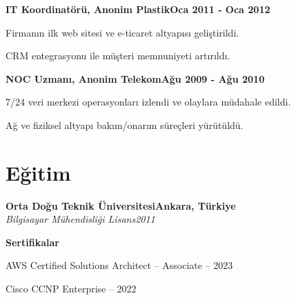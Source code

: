 \documentclass[a4paper,11pt]{article}
\newcommand{\heading}[2]{
  \hspace{10pt}#1\hfill#2\\
}
\newcommand{\headingBf}[2]{
  \heading{\textbf{#1}}{\textbf{#2}}
}
\newcommand{\headingIt}[2]{
  \heading{\textit{#1}}{\textit{#2}}
}
\newenvironment{resume_list}{
  \vspace{-7pt}
  \begin{itemize}[itemsep=-2px, parsep=1pt, leftmargin=30pt] 
}{
  \end{itemize}
}
\begin{document}
  \headingBf{IT Koordinatörü, Anonim Plastik}{Oca 2011 - Oca 2012}
  \begin{resume_list}
    \item Firmanın ilk web sitesi ve e-ticaret altyapısı geliştirildi.
    \item CRM entegrasyonu ile müşteri memnuniyeti artırıldı.
  \end{resume_list}

  \headingBf{NOC Uzmanı, Anonim Telekom}{Ağu 2009 - Ağu 2010}
  \begin{resume_list}
    \item 7/24 veri merkezi operasyonları izlendi ve olaylara müdahale edildi.
    \item Ağ ve fiziksel altyapı bakım/onarım süreçleri yürütüldü.
  \end{resume_list}


  \section{Eğitim}

  \headingBf{Orta Doğu Teknik Üniversitesi}{Ankara, Türkiye}
  \headingIt{Bilgisayar Mühendisliği Lisans}{2011}
  \vspace{5pt}
  \headingBf{Sertifikalar}{}
  \begin{resume_list}
    \item AWS Certified Solutions Architect – Associate – 2023
    \item Cisco CCNP Enterprise – 2022
  \end{resume_list}
\end{document}
